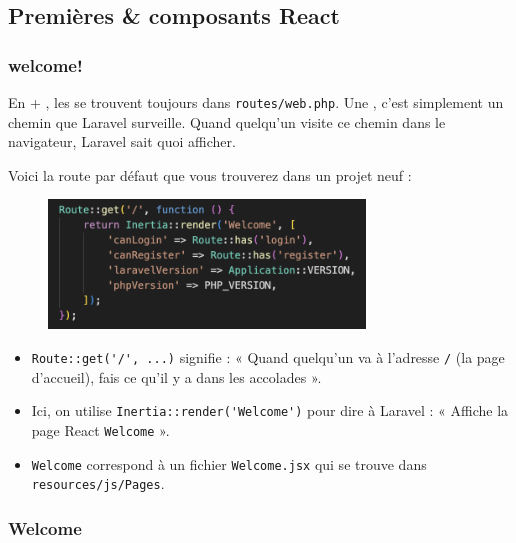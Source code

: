 \subsection{Premières \routes{} \& composants React}

\subsubsection[welcome!]{welcome!\label{sec:welcome!}}
En \laravel{} + \inertia{}, les \routes{} se trouvent toujours dans \verb|routes/web.php|.  
Une \route{}, c’est simplement un chemin que Laravel surveille. Quand quelqu’un visite ce chemin dans le navigateur, Laravel sait quoi afficher.

Voici la route par défaut que vous trouverez dans un projet neuf :
\begin{figure}[H]
    \centering
    \includegraphics[width=0.75\textwidth]{figures-C1/basic_route.png}
\end{figure}

\begin{itemize}
    \item \verb|Route::get('/', ...)| signifie : « Quand quelqu’un va à l’adresse \verb|/| (la page d’accueil), fais ce qu’il y a dans les accolades ».
    \item Ici, on utilise \verb|Inertia::render('Welcome')| pour dire à Laravel : « Affiche la page React \texttt{Welcome} ».
    \item \texttt{Welcome} correspond à un fichier \verb|Welcome.jsx| qui se trouve dans \verb|resources/js/Pages|.
\end{itemize}

\subsubsection[Welcome]{Welcome}

